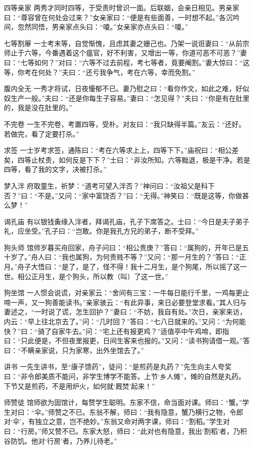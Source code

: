 \documentclass[12pt,UTF8]{ctexbook}
\begin{document}
四等亲家
两秀才同时四等，于受责时曾识一面。后联姻，会亲日相见。男亲家曰：“尊容曾在何处会过来？”女亲家曰：“便是有些面善，一时想不起。”各沉吟间，忽然同悟，男亲家点头曰：“嗄。”女亲家亦点头曰：“嗄。”

七等割屪
一士考末等，自觉惭愧，且虑其妻之姗己也。乃架一说诳妻曰：“从前宗师止于六等，今番遇着这个瘟官，好不利害，又增出一等，你道可恶不可恶？”妻曰：“七等如何？”对曰：“六等不过去前程，考七等者，竟要阉割。”妻大惊曰：“这等，你考在何处？”夫曰：“还亏我争气，考在六等，幸而免割。”

腹内全无
一秀才将试，日夜懮郁不已。妻乃慰之曰：“看你作文，如此之难，好似奴生产一般。”夫曰：“还是你每生子容易。”妻曰：“怎见得？”夫曰：“你是有在肚里的，我是没在肚里的。”

不完卷
一生不完卷，考置四等，受朴。对友曰：“我只缺得半篇。”友云：“还好。若做完，看了定要打杀。”

求签
一士岁考求签，通陈曰：“考在六等求上上，四等下下。”庙祝曰：“相公差矣，四等止杖责，如何反是下下？”士曰：“非汝所知。六等黜退，极是干净。若是四等，看了我的文字，决被打杀。”

梦入泮
府取童生，祈梦：“道考可望入泮否？”神问曰：“汝祖父是科下否？”曰：“不是。”又问：“家中富饶否？”曰：“无得。”神笑曰：“既是这等，你做甚么梦！”

谒孔庙
有以银钱夤缘入泮者，拜谒孔庙，孔子下席答之。士曰：“今日是夫子弟子礼，应坐受。”孔子曰：“岂敢。你是我孔方兄的弟子，断不受拜。”

狗头师
馆师岁暮买舟回家，舟子问曰：“相公贵庚？”答曰：“属狗的，开年已是五十岁了。”舟人曰：“我也属狗，为何贵贱不等？”又问：“那一月生的？”答曰：“正月。”舟子大悟曰：“是了，是了，怪不得！我十二月生，是个狗尾，所以摇了这一世。相公正月生，是个狗头，所以教（叫）了这一世。”

狗坐馆
一人惯会说谎，对亲家云：“舍间有三宝：一牛每日能行千里，一鸡每更止啼一声，又一狗善能读书。”亲家骇云：“有此异事，来日必要登堂求看。”其人归与妻述之，“一时说了谎，怎生回护？”妻曰：“不妨，我自有处。”次日，亲家来访，内云：“早上往北京去了。”问：“几时回？”答曰：“七八日就来的。”又问：“为何能快？”曰：“骑了自家牛去。”问：“宅上还有报更鸡？”适值亭中午鸡啼，即指曰：“只此便是，不但夜里报更，日间生客来也报的。”又问：“读书狗请借一观。”答曰：“不瞒亲家说，只为家寒，出外坐馆去了。”

讲书
一先生讲书，至“康子馈药”，徒问：“是煎药是丸药？”先生向主人夸奖曰：“非令郎美质不能问，非学生博学不能答。上节‘乡人傩”，傩的自然是丸药。下节又是煎药，不是用炉火，如何就‘厩焚’起来！”

师赞徒
馆师欲为固馆计，每赞学生聪明。东家不信，命当面对课。师曰：“蟹。”学生对曰：“伞。”师赞之不已。东翁不解，师曰：“我有隐意，蟹乃横行之物，令郎对‘伞’，有独立之意，岂不绝妙。”东翁又命对两字课，师曰：“割稻。”学生对曰：“行房。”师又赞不已。东家大怒，师曰：“此对也有隐意，我出‘割稻’者，乃积谷防饥。他对‘行房’者，乃养儿待老。”
\end{document}
